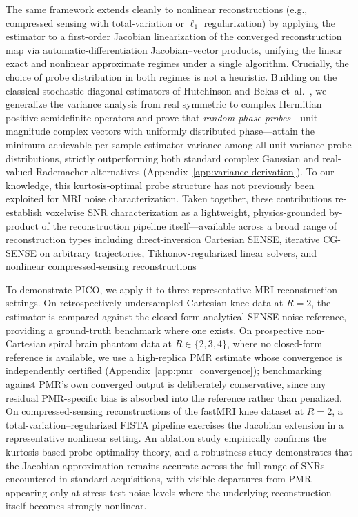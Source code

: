 \documentclass[AMA,STIX2COL,Linenumberson]{MRM}
\begin{document}
The same framework extends cleanly to nonlinear 
reconstructions (e.g., compressed sensing with 
total-variation or $\ell_1$ regularization) by applying the 
estimator to a first-order Jacobian linearization of the 
converged reconstruction map via automatic-differentiation 
Jacobian--vector products, unifying the linear exact and 
nonlinear approximate regimes under a single algorithm. 
Crucially, the choice of probe distribution in both regimes 
is not a heuristic. Building on the classical stochastic 
diagonal estimators of Hutchinson and Bekas et~al.\ 
\cite{hutchinson,bekas}, we generalize the variance analysis 
from real symmetric to complex Hermitian positive-semidefinite 
operators and prove that \emph{random-phase 
probes}---unit-magnitude complex vectors with uniformly 
distributed phase---attain the minimum achievable per-sample 
estimator variance among all unit-variance probe 
distributions, strictly outperforming both standard complex 
Gaussian and real-valued Rademacher alternatives 
(Appendix~\ref{app:variance-derivation}). To our knowledge, 
this kurtosis-optimal probe structure has not previously been 
exploited for MRI noise characterization. Taken together, 
these contributions re-establish voxelwise SNR 
characterization as a lightweight, physics-grounded 
by-product of the reconstruction pipeline itself---available across a broad range of reconstruction types including direct-inversion Cartesian SENSE, iterative CG-SENSE on arbitrary trajectories, Tikhonov-regularized linear solvers, and nonlinear compressed-sensing reconstructions


To demonstrate PICO, we apply it to three representative MRI reconstruction settings. On retrospectively undersampled Cartesian knee data at $R=2$, 
the estimator is compared against the closed-form analytical 
SENSE  noise reference, providing a ground-truth benchmark where 
one exists. On prospective non-Cartesian spiral brain phantom 
data at $R \in \{2,3,4\}$, where no closed-form reference is 
available, we use a high-replica PMR estimate whose convergence is 
independently certified (Appendix~\ref{app:pmr_convergence}); 
benchmarking against PMR's own converged output is 
deliberately conservative, since any residual PMR-specific 
bias is absorbed into the reference rather than penalized. 
On compressed-sensing reconstructions of the fastMRI knee 
dataset at $R=2$, a total-variation--regularized FISTA 
pipeline exercises the Jacobian extension in a representative 
nonlinear setting. An ablation study empirically confirms the 
kurtosis-based probe-optimality theory, and a robustness 
study demonstrates that the Jacobian approximation remains 
accurate across the full range of SNRs encountered in 
standard acquisitions, with visible departures from PMR 
appearing only at stress-test noise levels where the 
underlying reconstruction itself becomes strongly nonlinear.
\end{document}
